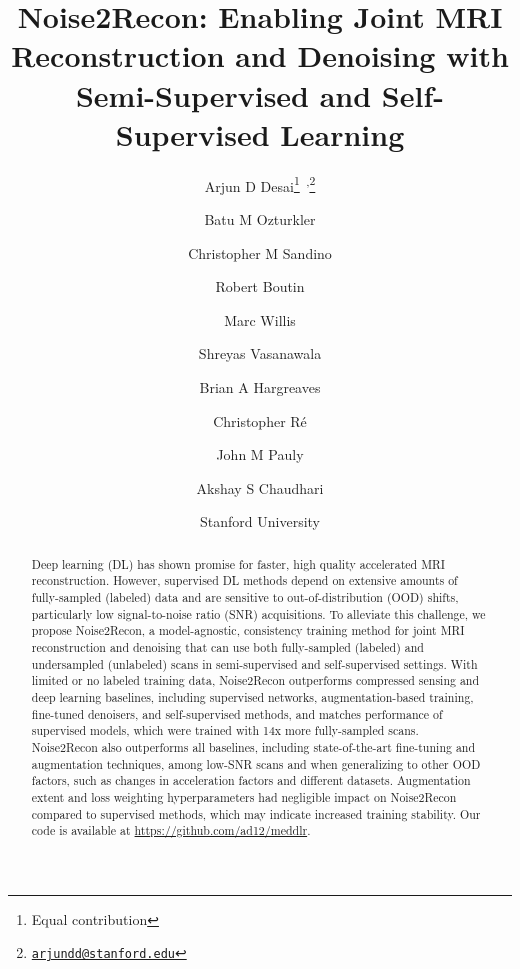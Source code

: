 \documentclass[10pt,twocolumn,letterpaper]{article}
\begin{document}
\title{Noise2Recon: Enabling Joint MRI Reconstruction and Denoising with Semi-Supervised and Self-Supervised Learning}

\author{Arjun D Desai\thanks{Equal contribution}\textsuperscript{$\;\;$,}\thanks{\href{mailto:arjundd@stanford.edu}{\texttt{arjundd@stanford.edu}}} \and Batu M Ozturkler\footnotemark[1] \and Christopher M Sandino \and Robert Boutin \and Marc Willis \and Shreyas Vasanawala \and Brian A Hargreaves \and Christopher R\'e \and John M Pauly \and Akshay S Chaudhari\\
}

\date{Stanford University}

\maketitle
\vspace{-2em}

\begin{abstract}
   Deep learning (DL) has shown promise for faster, high quality accelerated MRI reconstruction. However, supervised DL methods depend on extensive amounts of fully-sampled (labeled) data and are sensitive to out-of-distribution (OOD) shifts, particularly low signal-to-noise ratio (SNR) acquisitions. To alleviate this challenge, we propose Noise2Recon, a model-agnostic, consistency training method for joint MRI reconstruction and denoising that can use both fully-sampled (labeled) and undersampled (unlabeled) scans in semi-supervised and self-supervised settings. With limited or no labeled training data, Noise2Recon outperforms compressed sensing and deep learning baselines, including supervised networks, augmentation-based training, fine-tuned denoisers, and self-supervised methods, and matches performance of supervised models, which were trained with 14x more fully-sampled scans. Noise2Recon also outperforms all baselines, including state-of-the-art fine-tuning and augmentation techniques, among low-SNR scans and when generalizing to other OOD factors, such as changes in acceleration factors and different datasets. Augmentation extent and loss weighting hyperparameters had negligible impact on Noise2Recon compared to supervised methods, which may indicate increased training stability. Our code is available at \url{https://github.com/ad12/meddlr}.
\end{abstract}

\end{document}

